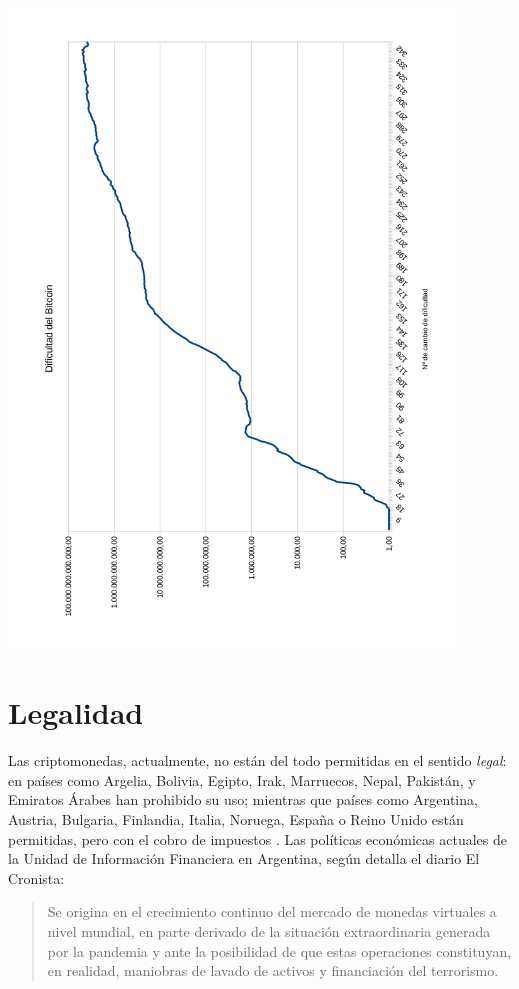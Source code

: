 \documentclass[12pt,a4paper,twoside]{book}
\begin{document}
\begin{center}
\includegraphics[width=0.9\textwidth,]{img/dif-bitcoin.pdf}
\end{center}

\section{Legalidad}
Las criptomonedas, actualmente, no están del todo permitidas en el sentido \textit{legal}: en países como Argelia, Bolivia, Egipto, Irak, Marruecos, Nepal, Pakistán, y Emiratos Árabes han prohibido su uso; mientras que países como Argentina, Austria, Bulgaria, Finlandia, Italia, Noruega, España o Reino Unido están permitidas, pero con el cobro de impuestos \cite[págs. 4-5]{cripto-legalidad}. Las políticas económicas actuales de la Unidad de Información Financiera en Argentina, según detalla el diario El Cronista:

\begin{quotation}
Se origina en el crecimiento continuo del mercado de monedas virtuales a nivel mundial, en parte derivado de la situación extraordinaria generada por la pandemia y ante la posibilidad de que estas operaciones constituyan, en realidad, maniobras de lavado de activos y financiación del terrorismo. \cite{cronista:uif}
\end{quotation}
\end{document}
